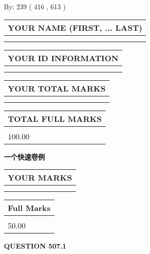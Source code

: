 \documentclass{ctexart}
\begin{document}
   
\hspace{1.0in} By: 
 239 ( 416 ,  613 )
   
   
   
   
\newpage 
\setcounter{page}{ 
   507001 } 
   
   
   
   
\noindent\begin{tabular}{|l|}
\hline
YOUR NAME (FIRST, ... LAST)  \\
\hline
 \\ 
 \\ 
\hline
\end{tabular}
\hspace{0.05in} \begin{tabular}{|l|}
\hline
 YOUR   ID   INFORMATION  \\
\hline
 \\ 
 \\ 
\hline
\end{tabular}
   
   
\vspace{0.2in}\noindent\begin{tabular}{|l|}
\hline
YOUR TOTAL MARKS  \\
\hline
 \\ 
 \\ 
\hline
\end{tabular}
\hspace{0.05in} \begin{tabular}{|l|}
\hline
TOTAL FULL MARKS  \\
\hline
 \\ 
100.00 \\
\hline
\end{tabular}
   
   
 \vspace{0.2in}
{\LARGE {\textbf{ 一个快速卷例}}}
   
   
  
\vspace{0.2in}
  
\noindent\begin{tabular}{|l|}
\hline
 YOUR MARKS  \\
\hline
 \\ 
 \\ 
\hline
\end{tabular}
\hspace{0.05in} \begin{tabular}{|l|}
\hline
 Full Marks  \\
\hline
 \\ 
50.00 \\
\hline
\end{tabular}
{\textbf{\Large{QUESTION
507.1 
}}}
  
\end{document}
